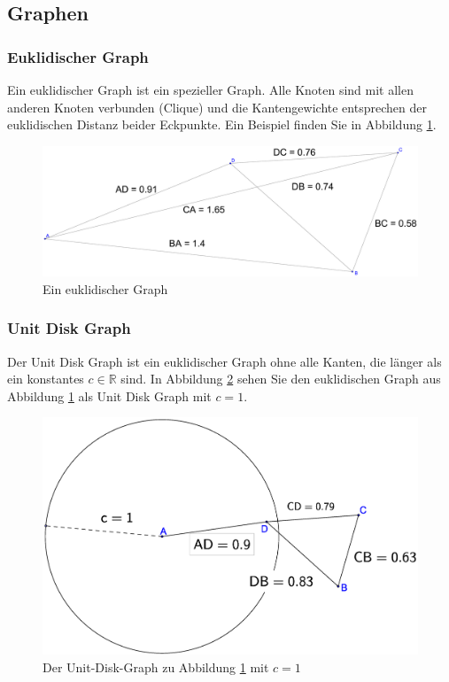 \documentclass[a4paper,twoside]{IEEEtran}
\begin{document}



\subsection{Graphen}
\subsubsection{Euklidischer Graph}
Ein euklidischer Graph ist ein spezieller Graph. Alle Knoten sind mit allen anderen Knoten verbunden (Clique) und die Kantengewichte entsprechen der euklidischen Distanz beider Eckpunkte. Ein Beispiel finden Sie in Abbildung \ref{fig:Graph}.
\begin{figure}[h!]
\centering
\includegraphics[width=0.99\linewidth]{Graph.eps}
\caption{Ein euklidischer Graph}
\label{fig:Graph}
\end{figure}
\subsubsection{Unit Disk Graph}
Der Unit Disk Graph ist ein euklidischer Graph ohne alle Kanten, die länger als ein konstantes $c \in \mathds{R} $ sind. In Abbildung \ref{fig:UnitGraph} sehen Sie den euklidischen Graph aus Abbildung \ref{fig:Graph} als Unit Disk Graph mit $c = 1 $.
\begin{figure}[h!]
\centering
\includegraphics[width=0.99\linewidth]{UnitGraph.eps}
\caption{Der Unit-Disk-Graph zu Abbildung \ref{fig:Graph} mit $c = 1 $}
\label{fig:UnitGraph}
\end{figure}
\end{document}
